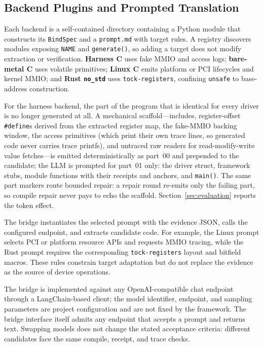 \subsection{Backend Plugins and Prompted Translation}
\label{sec:registry}
\label{sec:backends}

Each backend is a self-contained directory containing a Python module that
constructs its \texttt{BindSpec} and a \texttt{prompt.md} with target rules. A
registry discovers modules exposing \texttt{NAME} and \texttt{generate()}, so
adding a target does not modify extraction or verification. \textbf{Harness C}
uses fake MMIO and access logs; \textbf{bare-metal C} uses volatile primitives;
\textbf{Linux C} emits platform or PCI lifecycles and kernel MMIO; and
\textbf{Rust \texttt{no\_std}} uses \texttt{tock-registers}, confining
\texttt{unsafe} to base-address construction.

For the harness backend, the part of the program that is identical for every
driver is no longer generated at all. A mechanical scaffold---includes,
register-offset \texttt{\#define}s derived from the extracted register map,
the fake-MMIO backing window, the access primitives (which print their own
trace lines, so generated code never carries trace printfs), and untraced
raw readers for read-modify-write value fetches---is emitted
deterministically as part~00 and prepended to the candidate; the LLM is
prompted for part~01 only: the driver struct, framework stubs, module
functions with their receipts and anchors, and \texttt{main()}. The same
part markers route bounded repair: a repair round re-emits only the failing
part, so compile repair never pays to echo the scaffold.
Section~\ref{sec:evaluation} reports the token effect.

The bridge instantiates the selected prompt with the evidence JSON, calls the
configured endpoint, and extracts candidate code. For example, the Linux
prompt selects PCI or platform resource APIs and requests MMIO tracing, while
the Rust prompt requires the corresponding \texttt{tock-registers} layout and
bitfield macros. These rules constrain target adaptation but do not replace
the evidence as the source of device operations.

The bridge is implemented against any OpenAI-compatible chat endpoint
through a LangChain-based client; the model identifier, endpoint, and
sampling parameters are project configuration and are not fixed by the
framework. The bridge interface itself admits any endpoint that accepts
a prompt and returns text. Swapping models does not change the stated
acceptance criteria: different candidates face the same compile, receipt, and
trace checks.

